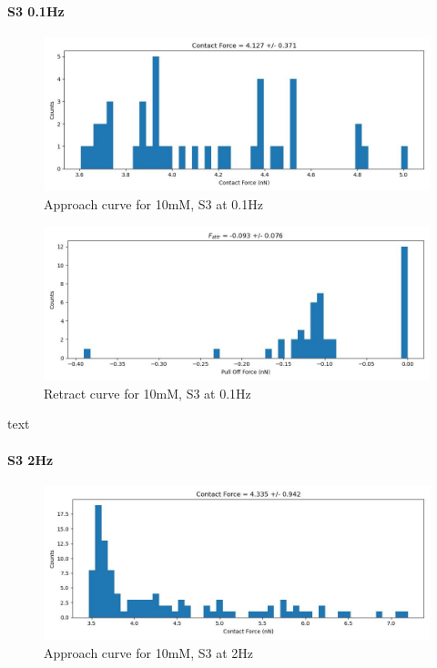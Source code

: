 \paragraph{S3 0.1Hz}
\begin{figure}[h!]
\centering
\includegraphics[width=\textwidth]{chapter7/Tip speed/10mM/S3 0.1Hz/approach_f_c_hist.jpg}
\caption{Approach curve for 10mM, S3 at 0.1Hz}
\end{figure}

\begin{figure}[h!]
\centering
\includegraphics[width=\textwidth]{chapter7/Tip speed/10mM/S3 0.1Hz/retract_f_a_hist.jpg}
\caption{Retract curve for 10mM, S3 at 0.1Hz}
\end{figure}
text
\newpage

\paragraph{S3 2Hz}
\begin{figure}[h!]
\centering
\includegraphics[width=\textwidth]{chapter7/Tip speed/10mM/S3 2Hz/approach_f_c_hist.jpg}
\caption{Approach curve for 10mM, S3 at 2Hz}
\end{figure}

